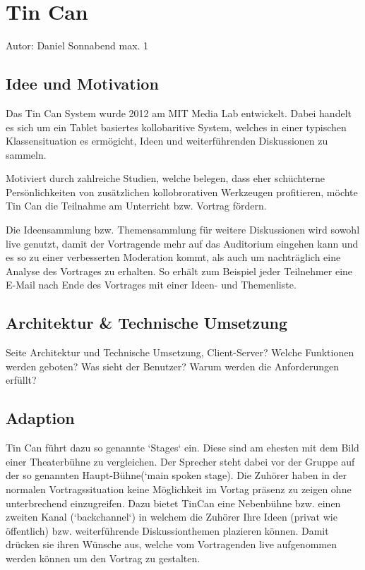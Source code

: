 \section{Tin Can}
Autor: Daniel Sonnabend max. 1  

\subsection{Idee und Motivation}
Das Tin Can System \cite{HarGorSch2012} wurde 2012 am MIT Media Lab entwickelt.
Dabei handelt es sich um ein Tablet basiertes kollobaritive System, welches in
einer typischen Klassensituation es ermögicht, Ideen und wei\-ter\-führ\-en\-den
Diskussionen zu sammeln.

Motiviert durch zahlreiche Studien, welche belegen, dass eher schüchterne
Persönlichkeiten von zusätzlichen kollobrorativen Werkzeugen profitieren, möchte
Tin Can die Teilnahme am Unterricht bzw. Vortrag fördern.

Die Ideensammlung bzw. Themensammlung für weitere Diskussionen wird sowohl live
genutzt, damit der Vortragende mehr auf das Auditorium eingehen kann und es so
zu einer verbesserten Moderation kommt, als auch um nach\-träglich eine Analyse
des Vortrages zu erhalten. So erhält zum Beispiel jeder Teilnehmer eine E-Mail
nach Ende des Vortrages mit einer Ideen- und Themenliste.

\subsection{Architektur \& Technische Umsetzung}
Seite Architektur und Technische Umsetzung,
Client-Server? Welche Funktionen werden geboten? Was sieht der Benutzer? Warum
werden die Anforderungen erfüllt? 

\subsection{Adaption}
Tin Can führt dazu so genannte `Stages` ein. Diese sind am ehesten mit dem Bild
einer Theaterbühne zu vergleichen. Der Sprecher steht dabei vor der Gruppe auf
der so genannten Haupt-Bühne(`main spoken stage). Die Zuhörer haben in der
normalen Vortragssituation keine Möglichkeit im Vortag präsenz zu zeigen ohne
unterbrechend einzugreifen. Dazu bietet TinCan eine Nebenbühne bzw. einen
zweiten Kanal (`backchannel`) in welchem die Zuhörer Ihre Ideen (privat wie
öffentlich) bzw. wei\-ter\-führ\-en\-de Dis\-kus\-sion\-themen plazieren können.
Damit drücken sie ihren Wünsche aus, welche vom Vortragenden live aufgenommen
werden können um den Vortrag zu gestalten.

